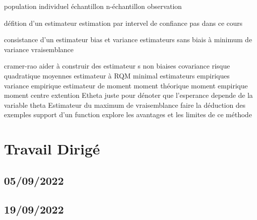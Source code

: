 \documentclass{article}
\begin{document}



\newpage
population
individuel
échantillon
n-échantillon
observation

défition d'un estimateur
estimation par intervel de confiance pas dans ce cours

consistance d'un estimateur
bias et variance
estimateurs sans biais à minimum de variance
vraisemblance

cramer-rao
aider à construir des estimateur s non biaises
covariance
risque quadratique moyennes
estimateur à RQM minimal
estimateurs empiriques
variance empirique
estimateur de moment
moment théorique
moment empirique
moment centre
extention
Etheta juste pour dénoter que l'esperance depende de la variable theta
Estimateur du maximum de vraisemblance
faire la déduction des exemples
support d'un function
explore les avantages et les limites de ce méthode


\section{Travail Dirigé}
\subsection{05/09/2022}
\subsection{19/09/2022}
\end{document}
